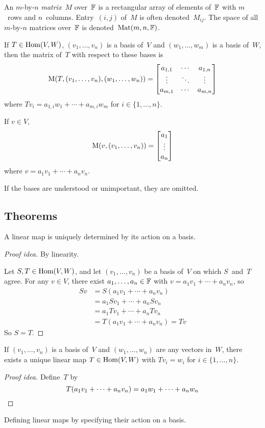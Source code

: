 \begin{defn}
An \(m\)-by-\(n\) \emph{matrix}~\(M\) over~\(\mathbb{F}\) is a rectangular array of elements of~\(\mathbb{F}\) with \(m\)~rows and \(n\)~columns. Entry~\((i,j)\) of~\(M\) is often denoted~\(M_{ij}\). The space of all \(m\)-by-\(n\) matrices over~\(\mathbb{F}\) is denoted~\(\operatorname{Mat}(m,n,\mathbb{F})\).

If \(T\in\operatorname{Hom}(V,W)\), \((v_1,\ldots,v_n)\) is a basis of~\(V\) and \((w_1,\ldots,w_m)\) is a basis of~\(W\), then the matrix of~\(T\) with respect to these bases is
\[\operatorname{M}(T,(v_1,\ldots,v_n),(w_1,\ldots,w_n))=\left[\begin{matrix}
a_{1,1}&\cdots&a_{1,n}\\
\vdots&\ddots&\vdots\\
a_{m,1}&\cdots&a_{m,n}
\end{matrix}\right]\]
where \(Tv_i=a_{1,i}w_1+\cdots+a_{m,i}w_m\) for \(i\in\{1,\ldots,n\}\).

If \(v\in V\),
\[\operatorname{M}(v,(v_1,\ldots,v_n))=\left[\begin{matrix}
a_1\\
\vdots\\
a_n
\end{matrix}\right]\]
where \(v=a_1v_1+\cdots+a_n v_n\).

If the bases are understood or unimportant, they are omitted.
\end{defn}

\subsection*{Theorems}
\begin{thm}[Uniqueness]
A linear map is uniquely determined by its action on a basis.
\end{thm}
\begin{proof}[Proof idea]
By linearity.

Let \(S,T\in\operatorname{Hom}(V,W)\), and let \((v_1,\ldots,v_n)\) be a basis of~\(V\) on which \(S\)~and~\(T\) agree. For any \(v\in V\), there exist \(a_1,\ldots,a_n\in\mathbb{F}\) with \(v=a_1v_1+\cdots+a_nv_n\), so
\begin{align*}
Sv&=S(a_1v_1+\cdots+a_nv_n)\\
	&=a_1Sv_1+\cdots+a_nSv_n\\
	&=a_1Tv_1+\cdots+a_nTv_n\\
	&=T(a_1v_1+\cdots+a_nv_n)=Tv
\end{align*}
So \(S=T\).
\end{proof}
\begin{cor}
If \((v_1,\ldots,v_n)\) is a basis of~\(V\) and \((w_1,\ldots,w_n)\) are any vectors in~\(W\), there exists a unique linear map \(T\in\operatorname{Hom}(V,W)\) with \(Tv_i=w_i\) for \(i\in\{1,\ldots,n\}\).
\end{cor}
\begin{proof}[Proof idea]
Define~\(T\) by
\begin{equation*}
T(a_1v_1+\cdots+a_nv_n)=a_1w_1+\cdots+a_nw_n\qedhere
\end{equation*}
\end{proof}
\begin{app}
Defining linear maps by specifying their action on a basis.
\end{app}

